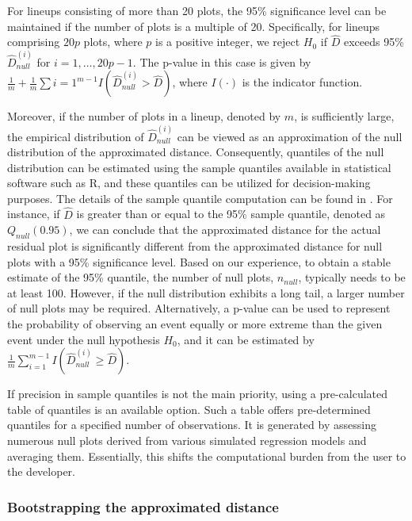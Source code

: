 \documentclass[]{interact}
\theoremstyle{plain}%
\theoremstyle{definition}
\theoremstyle{remark}
\begin{document}
For lineups consisting of more than 20 plots, the 95\% significance
level can be maintained if the number of plots is a multiple of 20.
Specifically, for lineups comprising \(20p\) plots, where \(p\) is a
positive integer, we reject \(H_0\) if \(\hat{D}\) exceeds 95\%
\({\hat{D}_{null}^{(i)}}\) for \(i = 1, \ldots, 20p-1\). The p-value in
this case is given by
\(\frac{1}{m} + \frac{1}{m}\sum{i=1}^{m-1} I\left(\hat{D}_{null}^{(i)} > \hat{D}\right)\),
where \(I(\cdot)\) is the indicator function.

Moreover, if the number of plots in a lineup, denoted by \(m\), is
sufficiently large, the empirical distribution of
\({\hat{D}_{null}^{(i)}}\) can be viewed as an approximation of the null
distribution of the approximated distance. Consequently, quantiles of
the null distribution can be estimated using the sample quantiles
available in statistical software such as R, and these quantiles can be
utilized for decision-making purposes. The details of the sample
quantile computation can be found in \citet{hyndman1996sample}. For
instance, if \(\hat{D}\) is greater than or equal to the 95\% sample
quantile, denoted as \(Q_{null}(0.95)\), we can conclude that the
approximated distance for the actual residual plot is significantly
different from the approximated distance for null plots with a 95\%
significance level. Based on our experience, to obtain a stable estimate
of the 95\% quantile, the number of null plots, \(n_{null}\), typically
needs to be at least 100. However, if the null distribution exhibits a
long tail, a larger number of null plots may be required. Alternatively,
a p-value can be used to represent the probability of observing an event
equally or more extreme than the given event under the null hypothesis
\(H_0\), and it can be estimated by
\(\frac{1}{m}\sum_{i=1}^{m-1}I\left(\hat{D}_{null}^{(i)} \geq \hat{D}\right)\).

If precision in sample quantiles is not the main priority, using a
pre-calculated table of quantiles is an available option. Such a table
offers pre-determined quantiles for a specified number of observations.
It is generated by assessing numerous null plots derived from various
simulated regression models and averaging them. Essentially, this shifts
the computational burden from the user to the developer.

\subsubsection{Bootstrapping the approximated
distance}\label{bootstrapping-the-approximated-distance}
\end{document}
